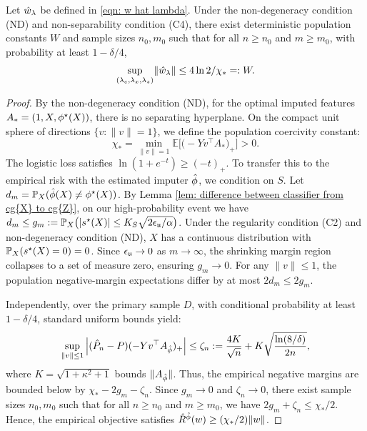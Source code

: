 \begin{lem}\label{lem: whl bounding} Let $\hat{w}_\lambda$ be defined in \eqref{eqn: w hat lambda}. Under the non-degeneracy condition (ND) and non-separability condition (C4), there exist deterministic population constants $W$ and sample sizes $n_0, m_0$ such that for all $n \ge n_0$ and $m \ge m_0$, with probability at least $1-\delta/4$,
     \begin{equation*}
         \sup_{(\lambda_c,\lambda_x,\lambda_z)}\lVert \hat{w}_\lambda \rVert \le 4\ln 2 / \chi_* =: W.
     \end{equation*}
 \end{lem}
 
 \begin{proof}
 By the non-degeneracy condition (ND), for the optimal imputed features $A_* = (1, X, \phi^\star(X))$, there is no separating hyperplane. On the compact unit sphere of directions $\{v : \|v\|=1\}$, we define the population coercivity constant:
 \begin{equation*}
     \chi_* = \min_{\lVert v \rVert=1} \mathbb{E}\Big[\big(-Y v^\top A_*\big)_+\Big] > 0.
 \end{equation*}
 The logistic loss satisfies $\ln(1+e^{-t}) \ge (-t)_+$. To transfer this to the empirical risk with the estimated imputer $\hat{\phi}$, we condition on $S$. Let $d_m = \mathbb{P}_X(\hat{\phi}(X) \neq \phi^\star(X))$. By Lemma \ref{lem: difference between classifier from cg{X} to cg{Z}}, on our high-probability event we have $d_m \le g_m := \mathbb{P}_X\big(|s^\star(X)| \le K_S \sqrt{2\epsilon_{\mathfrak{u}}/\alpha}\big)$. Under the regularity condition (C2) and non-degeneracy condition (ND), $X$ has a continuous distribution with $\mathbb{P}_X(s^\star(X) = 0) = 0$. Since $\epsilon_{\mathfrak{u}} \to 0$ as $m \to \infty$, the shrinking margin region collapses to a set of measure zero, ensuring $g_m \to 0$. For any $\|v\|\le 1$, the population negative-margin expectations differ by at most $2d_m \le 2g_m$. 

Independently, over the primary sample $D$, with conditional probability at least $1-\delta/4$, standard uniform bounds yield:
\begin{equation*}
    \sup_{\|v\|\le 1} \left| (\hat{P}_n - P)(-Y v^\top A_{\hat{\phi}})_+ \right| \le \zeta_n := \frac{4K}{\sqrt{n}} + K\sqrt{\frac{\ln(8/\delta)}{2n}},
\end{equation*}
where $K = \sqrt{1+\kappa^2+1}$ bounds $\|A_{\hat{\phi}}\|$. Thus, the empirical negative margins are bounded below by $\chi_* - 2g_m - \zeta_n$. Since $g_m \to 0$ and $\zeta_n \to 0$, there exist sample sizes $n_0, m_0$ such that for all $n \ge n_0$ and $m \ge m_0$, we have $2g_m + \zeta_n \le \chi_*/2$. Hence, the empirical objective satisfies $\hat{R}^{\hat{\phi}}(w) \ge (\chi_*/2)\|w\|$.
 

\end{proof}
